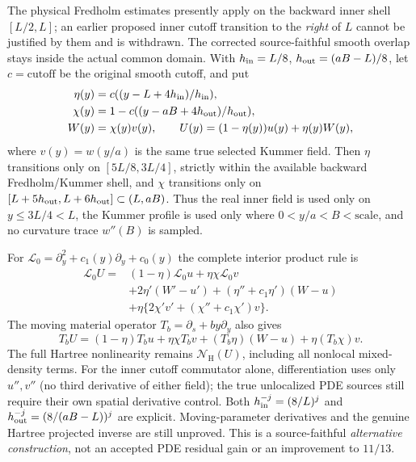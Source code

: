 \documentclass[11pt]{amsart}
\begin{document}
The physical Fredholm estimates presently apply on the backward
inner shell \([L/2,L]\); an earlier proposed inner cutoff transition
to the \emph{right} of \(L\) cannot be justified by them and is
withdrawn. The corrected source-faithful smooth overlap stays
inside the actual common domain. With
\(h_{\rm in}=L/8\), \(h_{\rm out}=(aB-L)/8\),
let \(c=\mathrm{cutoff}\) be the original smooth cutoff, and put
\[
 \begin{split}
 \eta(y)&=c((y-L+4h_{\rm in})/h_{\rm in}),\\
 \chi(y)&=1-c((y-aB+4h_{\rm out})/h_{\rm out}),\\
 W(y)&=\chi(y)v(y),\qquad
 U(y)=(1-\eta(y))u(y)+\eta(y)W(y),
 \end{split}
\]
where \(v(y)=w(y/a)\) is the same true selected Kummer field.
Then \(\eta\) transitions only on \([5L/8,3L/4]\),
strictly within the available backward Fredholm/Kummer shell,
and \(\chi\) transitions only on
\([L+5h_{\rm out},L+6h_{\rm out}]\subset(L,aB)\).
Thus the real inner field is used only on \(y\le3L/4<L\),
the Kummer profile is used only where
\(0<y/a<B<\mathrm{scale}\), and no
curvature trace \(w''(B)\) is sampled.

For \(\mathcal L_0=\partial_y^2+c_1(y)\partial_y+c_0(y)\)
the complete interior product rule is
\[
\begin{aligned}
 \mathcal L_0 U={}&
 (1-\eta)\mathcal L_0u+\eta\chi\mathcal L_0v\\
 &+2\eta'(W'-u')+(\eta''+c_1\eta')(W-u)\\
 &+\eta\{2\chi'v'+(\chi''+c_1\chi')v\}.
\end{aligned}
\]
The moving material operator \(T_b=\partial_s+by\partial_y\)
also gives
\[
 T_bU=(1-\eta)T_bu+\eta\chi T_bv
      +(T_b\eta)(W-u)+\eta(T_b\chi)v.
\]
The full Hartree nonlinearity remains
\(\mathcal N_{\mathrm H}(U)\), including all nonlocal
mixed-density terms. For the inner cutoff commutator alone, differentiation
uses only \(u'',v''\) (no third derivative of either field);
the true unlocalized PDE sources still require their
own spatial derivative control.
Both \(h_{\rm in}^{-j}=(8/L)^j\) and
\(h_{\rm out}^{-j}=(8/(aB-L))^j\) are explicit.
Moving-parameter derivatives and the genuine Hartree
projected inverse are still unproved. This is a source-faithful
\emph{alternative construction}, not an accepted
PDE residual gain or an improvement to \(11/13\).
\end{document}
